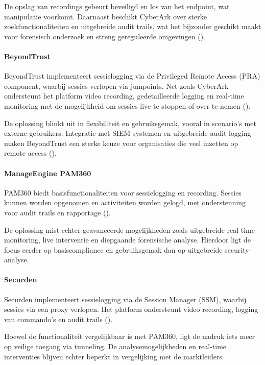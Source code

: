 De opslag van recordings gebeurt beveiligd en los van het endpoint, wat manipulatie voorkomt. Daarnaast beschikt CyberArk over sterke zoekfunctionaliteiten en uitgebreide audit trails, wat het bijzonder geschikt maakt voor forensisch onderzoek en streng gereguleerde omgevingen (\cite{cyberark_psm,nist2020}).

\paragraph{BeyondTrust}
BeyondTrust implementeert sessielogging via de Privileged Remote Access (PRA) component, waarbij sessies verlopen via jumpoints. Net zoals CyberArk ondersteunt het platform video recording, gedetailleerde logging en real-time monitoring met de mogelijkheid om sessies live te stoppen of over te nemen (\cite{beyondtrust_architecture,beyondtrust_jumpoint}).

De oplossing blinkt uit in flexibiliteit en gebruiksgemak, vooral in scenario’s met externe gebruikers. Integratie met SIEM-systemen en uitgebreide audit logging maken BeyondTrust een sterke keuze voor organisaties die veel inzetten op remote access (\cite{beyondtrust_architecture}).

\paragraph{ManageEngine PAM360}
PAM360 biedt basisfunctionaliteiten voor sessielogging en recording. Sessies kunnen worden opgenomen en activiteiten worden gelogd, met ondersteuning voor audit trails en rapportage (\cite{pam360_architecture}).

De oplossing mist echter geavanceerde mogelijkheden zoals uitgebreide real-time monitoring, live interventie en diepgaande forensische analyse. Hierdoor ligt de focus eerder op basiscompliance en gebruiksgemak dan op uitgebreide security-analyse.

\paragraph{Securden}
Securden implementeert sessielogging via de Session Manager (SSM), waarbij sessies via een proxy verlopen. Het platform ondersteunt video recording, logging van commando’s en audit trails (\cite{securden_session_monitoring,securden_remote_gateway}).

Hoewel de functionaliteit vergelijkbaar is met PAM360, ligt de nadruk iets meer op veilige toegang via tunneling. De analysemogelijkheden en real-time interventies blijven echter beperkt in vergelijking met de marktleiders.

